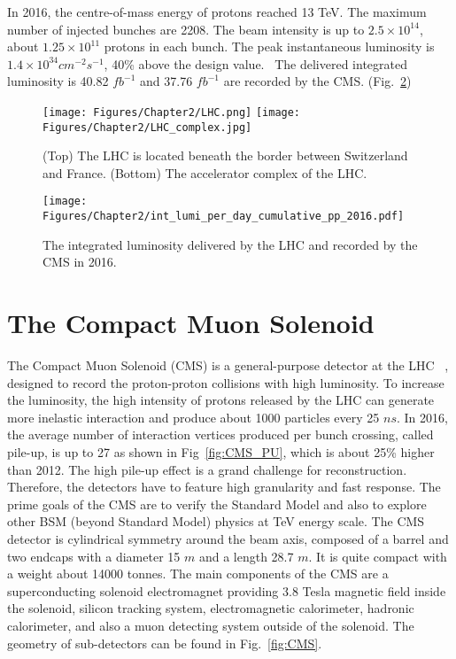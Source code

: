 In 2016, the centre-of-mass energy of protons reached 13 TeV.
The maximum number of injected bunches are 2208.
The beam intensity is up to $2.5 \times 10^{14}$, about $1.25 \times 10^{11}$ protons in each bunch.
The peak instantaneous luminosity is $1.4 \times 10^{34} cm^{-2}s^{-1}$, 40\% above the design value.~\cite{LHCStatistics}
The delivered integrated luminosity is 40.82 $fb^{-1}$ and 37.76 $fb^{-1}$ are recorded by the CMS. (Fig.~\ref{fig:lumi})~\cite{CMSLumiPublic}

\begin{figure}[t]
  \centering
  \texttt{[image: Figures/Chapter2/LHC.png]}
  \texttt{[image: Figures/Chapter2/LHC\_complex.jpg]}
  \caption{(Top) The LHC is located beneath the border between Switzerland and France. (Bottom) The accelerator complex of the LHC.}
  \label{fig:LHC}
\end{figure}

\begin{figure}[t]
  \centering
  \texttt{[image: Figures/Chapter2/int\_lumi\_per\_day\_cumulative\_pp\_2016.pdf]}
  \caption{The integrated luminosity delivered by the LHC and recorded by the CMS in 2016.}
  \label{fig:lumi}
\end{figure}


\section{The Compact Muon Solenoid}

The Compact Muon Solenoid (CMS) is a general-purpose detector at the LHC ~\cite{Chatrchyan:2008aa},
designed to record the proton-proton collisions with high luminosity.
To increase the luminosity, the high intensity of protons released by the LHC can generate more inelastic interaction and produce about 1000 particles every 25 $ns$.
In 2016, the average number of interaction vertices produced per bunch crossing, called pile-up, is up to 27 as shown in Fig~\ref{fig:CMS_PU}, which is about 25\% higher than 2012.
The high pile-up effect is a grand challenge for reconstruction.
Therefore, the detectors have to feature high granularity and fast response.
The prime goals of the CMS are to verify the Standard Model and also to explore other BSM (beyond Standard Model) physics at TeV energy scale.
The CMS detector is cylindrical symmetry around the beam axis, composed of a barrel and two endcaps with a diameter 15 $m$ and a length 28.7 $m$.
It is quite compact with a weight about 14000 tonnes.
The main components of the CMS are a superconducting solenoid electromagnet providing 3.8 Tesla magnetic field inside the solenoid,
silicon tracking system, electromagnetic calorimeter, hadronic calorimeter, and also a muon detecting system outside of the solenoid. 
The geometry of sub-detectors can be found in Fig.~\ref{fig:CMS}.

